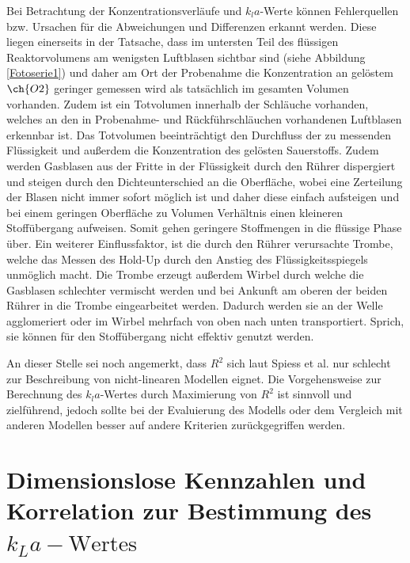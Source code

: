 \documentclass[12pt,liststotoc]{report}
\begin{document}
Bei Betrachtung der Konzentrationsverläufe und $k_la$-Werte können Fehlerquellen bzw. Ursachen für die Abweichungen und Differenzen erkannt werden. Diese liegen einerseits in der Tatsache, dass im untersten Teil des flüssigen Reaktorvolumens am wenigsten Luftblasen sichtbar sind (siehe Abbildung \ref{Fotoserie1}) und daher am Ort der Probenahme die Konzentration an gelöstem $\ch{O2}$ geringer gemessen wird als tatsächlich im gesamten Volumen vorhanden. Zudem ist ein Totvolumen innerhalb der Schläuche vorhanden, welches an den in Probenahme- und Rückführschläuchen vorhandenen Luftblasen erkennbar ist. Das Totvolumen beeinträchtigt den Durchfluss der zu messenden Flüssigkeit und außerdem die Konzentration des gelösten Sauerstoffs. Zudem werden Gasblasen aus der Fritte in der Flüssigkeit durch den Rührer dispergiert und steigen durch den Dichteunterschied an die Oberfläche, wobei eine Zerteilung der Blasen nicht immer sofort möglich ist und daher diese einfach aufsteigen und bei einem geringen Oberfläche zu Volumen Verhältnis einen kleineren Stoffübergang aufweisen. Somit gehen geringere Stoffmengen in die flüssige Phase über. Ein weiterer Einflussfaktor, ist die durch den Rührer verursachte Trombe, welche das Messen des Hold-Up durch den Anstieg des Flüssigkeitsspiegels unmöglich macht. Die Trombe erzeugt außerdem Wirbel durch welche die Gasblasen schlechter vermischt werden und bei Ankunft am oberen der beiden Rührer in die Trombe eingearbeitet werden. Dadurch werden sie an der Welle agglomeriert oder im Wirbel mehrfach von oben nach unten transportiert. Sprich, sie können für den Stoffübergang nicht effektiv genutzt werden.\newline

An dieser Stelle sei noch angemerkt, dass $R^2$ sich laut Spiess et al. \cite{rquadrat} nur schlecht zur Beschreibung von nicht-linearen Modellen eignet. Die Vorgehensweise zur Berechnung des $k_la$-Wertes durch Maximierung von $R^2$ ist sinnvoll und zielführend, jedoch sollte bei der Evaluierung des Modells oder dem Vergleich mit anderen Modellen besser auf andere Kriterien zurückgegriffen werden.

\section{Dimensionslose Kennzahlen und Korrelation zur Bestimmung des $k_La - \text{Wertes}$}
\end{document}

